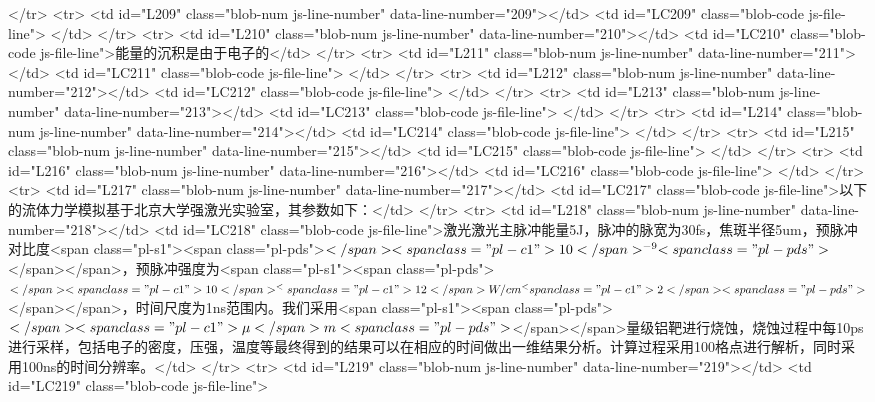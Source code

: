       </tr>
      <tr>
        <td id="L209" class="blob-num js-line-number" data-line-number="209"></td>
        <td id="LC209" class="blob-code js-file-line">
</td>
      </tr>
      <tr>
        <td id="L210" class="blob-num js-line-number" data-line-number="210"></td>
        <td id="LC210" class="blob-code js-file-line">能量的沉积是由于电子的</td>
      </tr>
      <tr>
        <td id="L211" class="blob-num js-line-number" data-line-number="211"></td>
        <td id="LC211" class="blob-code js-file-line">
</td>
      </tr>
      <tr>
        <td id="L212" class="blob-num js-line-number" data-line-number="212"></td>
        <td id="LC212" class="blob-code js-file-line">
</td>
      </tr>
      <tr>
        <td id="L213" class="blob-num js-line-number" data-line-number="213"></td>
        <td id="LC213" class="blob-code js-file-line">
</td>
      </tr>
      <tr>
        <td id="L214" class="blob-num js-line-number" data-line-number="214"></td>
        <td id="LC214" class="blob-code js-file-line">
</td>
      </tr>
      <tr>
        <td id="L215" class="blob-num js-line-number" data-line-number="215"></td>
        <td id="LC215" class="blob-code js-file-line">
</td>
      </tr>
      <tr>
        <td id="L216" class="blob-num js-line-number" data-line-number="216"></td>
        <td id="LC216" class="blob-code js-file-line">
</td>
      </tr>
      <tr>
        <td id="L217" class="blob-num js-line-number" data-line-number="217"></td>
        <td id="LC217" class="blob-code js-file-line">以下的流体力学模拟基于北京大学强激光实验室，其参数如下：</td>
      </tr>
      <tr>
        <td id="L218" class="blob-num js-line-number" data-line-number="218"></td>
        <td id="LC218" class="blob-code js-file-line">激光激光主脉冲能量5J，脉冲的脉宽为30fs，焦斑半径5um，预脉冲对比度<span class="pl-s1"><span class="pl-pds">$</span><span class="pl-c1">10</span>^{-9}<span class="pl-pds">$</span></span>，预脉冲强度为<span class="pl-s1"><span class="pl-pds">$</span><span class="pl-c1">10</span>^<span class="pl-c1">12</span>W/cm^<span class="pl-c1">2</span><span class="pl-pds">$</span></span>，时间尺度为1ns范围内。我们采用<span class="pl-s1"><span class="pl-pds">$</span><span class="pl-c1">\mu</span> m<span class="pl-pds">$</span></span>量级铝靶进行烧蚀，烧蚀过程中每10ps进行采样，包括电子的密度，压强，温度等最终得到的结果可以在相应的时间做出一维结果分析。计算过程采用100格点进行解析，同时采用100ns的时间分辨率。</td>
      </tr>
      <tr>
        <td id="L219" class="blob-num js-line-number" data-line-number="219"></td>
        <td id="LC219" class="blob-code js-file-line">
